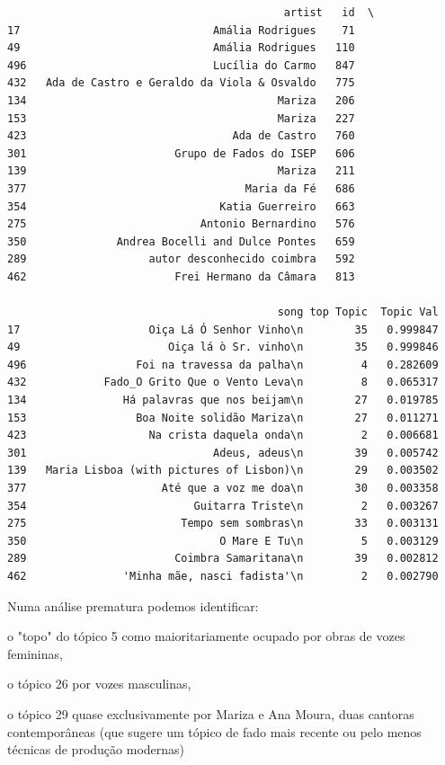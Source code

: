 \documentclass[11pt]{article}
\begin{document}
    
    \begin{verbatim}
                                           artist   id  \
17                              Amália Rodrigues    71   
49                              Amália Rodrigues   110   
496                             Lucília do Carmo   847   
432   Ada de Castro e Geraldo da Viola & Osvaldo   775   
134                                       Mariza   206   
153                                       Mariza   227   
423                                Ada de Castro   760   
301                       Grupo de Fados do ISEP   606   
139                                       Mariza   211   
377                                  Maria da Fé   686   
354                              Katia Guerreiro   663   
275                           Antonio Bernardino   576   
350              Andrea Bocelli and Dulce Pontes   659   
289                   autor desconhecido coimbra   592   
462                       Frei Hermano da Câmara   813   

                                          song top Topic  Topic Val  
17                    Oiça Lá Ó Senhor Vinho\n        35   0.999847  
49                       Oiça lá ò Sr. vinho\n        35   0.999846  
496                 Foi na travessa da palha\n         4   0.282609  
432            Fado_O Grito Que o Vento Leva\n         8   0.065317  
134               Há palavras que nos beijam\n        27   0.019785  
153                 Boa Noite solidão Mariza\n        27   0.011271  
423                   Na crista daquela onda\n         2   0.006681  
301                             Adeus, adeus\n        39   0.005742  
139   Maria Lisboa (with pictures of Lisbon)\n        29   0.003502  
377                     Até que a voz me doa\n        30   0.003358  
354                          Guitarra Triste\n         2   0.003267  
275                        Tempo sem sombras\n        33   0.003131  
350                              O Mare E Tu\n         5   0.003129  
289                       Coimbra Samaritana\n        39   0.002812  
462               'Minha mãe, nasci fadista'\n         2   0.002790  
    \end{verbatim}

    
    Numa análise prematura podemos identificar:

o "topo" do tópico 5 como maioritariamente ocupado por obras de vozes
femininas,

o tópico 26 por vozes masculinas,

o tópico 29 quase exclusivamente por Mariza e Ana Moura, duas cantoras
contemporâneas (que sugere um tópico de fado mais recente ou pelo menos
técnicas de produção modernas)
\end{document}
